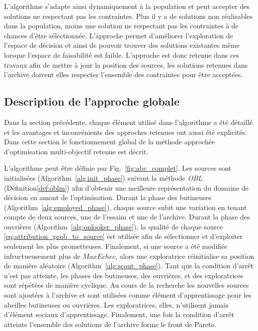 L’algorithme s’adapte ainsi dynamiquement à la population et peut accepter des
solutions ne respectant pas les contraintes. Plus il y a de solutions non
réalisables dans la population, moins une solution ne respectant pas les contraintes à
de chances d’être sélectionnée. L’approche permet d’améliorer l’exploration de
l’espace de décision et ainsi de pouvoir trouver des solutions existantes même
lorsque l’espace de faisabilité est faible.
L’approche est donc retenue dans ces travaux afin de mettre à jour la position des
sources, les solutions retenues dans l’archive doivent elles respecter
l’ensemble des contraintes pour être acceptées.


\subsection{Description de l’approche globale} %
\label{sub:description_de_l_approche_globale}
Dans la section précédente, chaque élément utilisé dans l’algorithme a été détaillé et
les avantages et inconvénients des approches retenues ont aussi été explicités.
Dans cette section le fonctionnement global de la méthode approchée d’optimisation
multi-objectif retenue est décrit.

L’algorithme peut être définie par Fig.~\ref{fig:abc_complet}.
Les sources sont initialisées (Algorithm~\ref{alg:init_phase}) suivant la méthode
\textit{OBL} (Définition\ref{def:oblm}) afin d’obtenir une meilleure représentation du
domaine de décision en amont de l’optimisation.
Durant la phase des butineuses (Algorithm~\ref{alg:employed_phase}), chaque source
subit une variation en tenant compte de deux sources, une de l’essaim et une de l’archive.
Durant la phase des ouvrières (Algorithm~\ref{alg:onlooker_phase}), la qualité de
chaque source \eqref{eq:attribution_prob_to_source} est utilisée afin de sélectionner
et d’exploiter seulement les plus prometteuses. Finalement, si une source a été
modifiée infructueusement plus de $MaxEchec$, alors une exploratrice
réinitialise sa position de manière aléatoire  (Algorithm~\ref{alg:scout_phase}).
Tant que la condition d’arrêt n’est pas atteinte, les phases des butineuses,
des ouvrières, et des exploratrices sont répétées de manière cyclique. Au cours de
la recherche les nouvelles sources sont ajoutées à l’archive et sont utilisées
comme élément d’apprentissage pour les abeilles butineuses ou ouvrières. Les
exploratrices, elles, n’utilisent jamais d’élément sociaux d’apprentissage.
Finalement, une fois la condition d’arrêt atteinte l’ensemble des solutions
de l’archive forme le front de Pareto.


